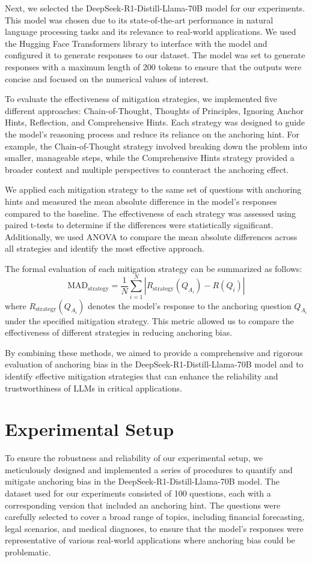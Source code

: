 \documentclass{article}
\begin{document}
Next, we selected the DeepSeek-R1-Distill-Llama-70B model for our experiments. This model was chosen due to its state-of-the-art performance in natural language processing tasks and its relevance to real-world applications. We used the Hugging Face Transformers library to interface with the model and configured it to generate responses to our dataset. The model was set to generate responses with a maximum length of 200 tokens to ensure that the outputs were concise and focused on the numerical values of interest.

To evaluate the effectiveness of mitigation strategies, we implemented five different approaches: Chain-of-Thought, Thoughts of Principles, Ignoring Anchor Hints, Reflection, and Comprehensive Hints. Each strategy was designed to guide the model's reasoning process and reduce its reliance on the anchoring hint. For example, the Chain-of-Thought strategy involved breaking down the problem into smaller, manageable steps, while the Comprehensive Hints strategy provided a broader context and multiple perspectives to counteract the anchoring effect.

We applied each mitigation strategy to the same set of questions with anchoring hints and measured the mean absolute difference in the model's responses compared to the baseline. The effectiveness of each strategy was assessed using paired t-tests to determine if the differences were statistically significant. Additionally, we used ANOVA to compare the mean absolute differences across all strategies and identify the most effective approach.

The formal evaluation of each mitigation strategy can be summarized as follows:
\[
\text{MAD}_{\text{strategy}} = \frac{1}{N} \sum_{i=1}^{N} |R_{\text{strategy}}(Q_{A_i}) - R(Q_i)|
\]
where \( R_{\text{strategy}}(Q_{A_i}) \) denotes the model's response to the anchoring question \( Q_{A_i} \) under the specified mitigation strategy. This metric allowed us to compare the effectiveness of different strategies in reducing anchoring bias.

By combining these methods, we aimed to provide a comprehensive and rigorous evaluation of anchoring bias in the DeepSeek-R1-Distill-Llama-70B model and to identify effective mitigation strategies that can enhance the reliability and trustworthiness of LLMs in critical applications.

\section{Experimental Setup}
To ensure the robustness and reliability of our experimental setup, we meticulously designed and implemented a series of procedures to quantify and mitigate anchoring bias in the DeepSeek-R1-Distill-Llama-70B model. The dataset used for our experiments consisted of 100 questions, each with a corresponding version that included an anchoring hint. The questions were carefully selected to cover a broad range of topics, including financial forecasting, legal scenarios, and medical diagnoses, to ensure that the model's responses were representative of various real-world applications where anchoring bias could be problematic.
\end{document}
